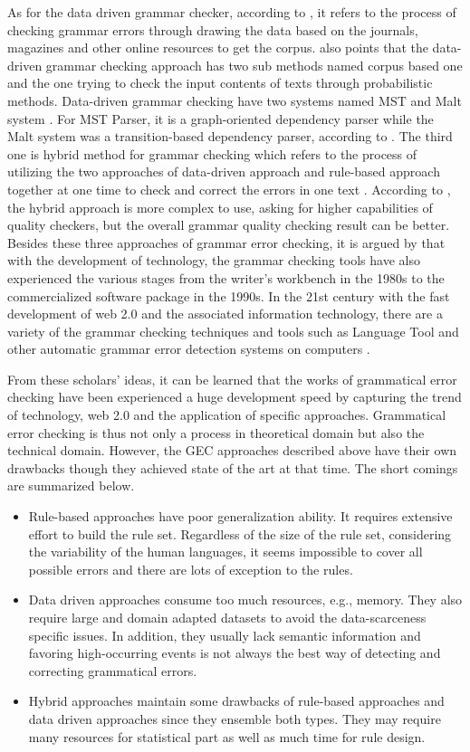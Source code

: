 As for the data driven grammar checker, according to \cite{naber2003rule}, it refers to the process of checking grammar errors through drawing the data based on the journals, magazines and other online resources to get the corpus. \cite{naber2003rule} also points that the data-driven grammar checking approach has two sub methods named corpus based one and the one trying to check the input contents of texts through probabilistic methods. Data-driven grammar checking have two systems named MST and Malt system \cite{plank2010grammar}. For MST Parser, it is a graph-oriented dependency parser while the Malt system was a transition-based dependency parser, according to \cite{plank2010grammar}. The third one is hybrid method for grammar checking which refers to the process of utilizing the two approaches of data-driven approach and rule-based approach together at one time to check and correct the errors in one text \cite{bhirud2017grammar}. According to \cite{bhirud2017grammar}, the hybrid approach is more complex to use, asking for higher capabilities of quality checkers, but the overall grammar quality checking result can be better. 
Besides these three approaches of grammar error checking, it is argued by \cite{soni2018systematic} that with the development of technology, the grammar checking tools have also experienced the various stages from the writer’s workbench in the 1980s to the commercialized software package in the 1990s. In the 21st century with the fast development of web 2.0 and the associated information technology, there are a variety of the grammar checking techniques and tools such as Language Tool and other automatic grammar error detection systems on computers \cite{soni2018systematic}.

From these scholars’ ideas, it can be learned that the works of grammatical error checking have been experienced a huge development speed by capturing the trend of technology, web 2.0 and the application of specific approaches. Grammatical error checking is thus not only a process in theoretical domain but also the technical domain. However, the GEC approaches described above have their own drawbacks though they achieved state of the art at that time. The short comings are summarized below.
\begin{itemize}
    \item Rule-based approaches have poor generalization ability. It requires extensive effort to build the rule set. Regardless of the size of the rule set, considering the variability of the human languages, it seems impossible to cover all possible errors and there are lots of exception to the rules.
    \item Data driven approaches consume too much resources, e.g., memory. They also require large and domain adapted datasets to avoid the data-scarceness specific issues. In addition, they usually lack semantic information and favoring high-occurring events is not always the best way of detecting and correcting grammatical errors.
    \item Hybrid approaches maintain some drawbacks of rule-based approaches and data driven approaches since they ensemble both types. They may require many resources for statistical part as well as much time for rule design.
\end{itemize}

